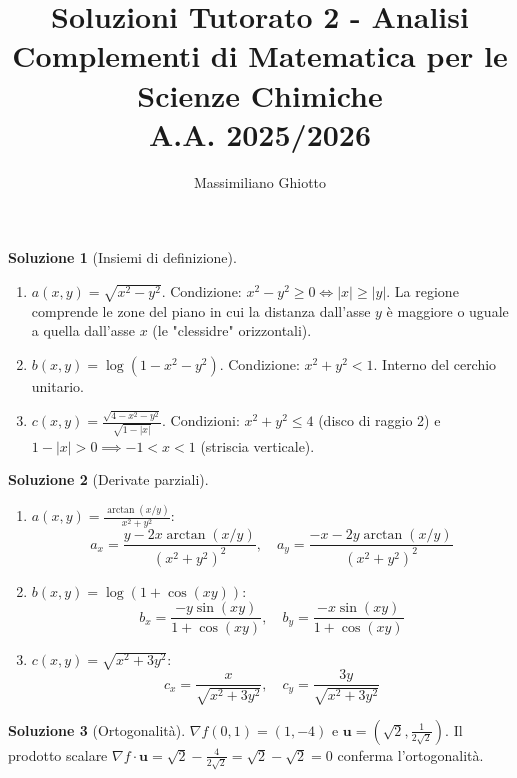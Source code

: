 \documentclass[12pt,a4paper]{article}
\title{Soluzioni Tutorato 2 - Analisi\\Complementi di Matematica per le Scienze Chimiche\\ A.A. 2025/2026}
\author{Massimiliano Ghiotto}
\date{}
\theoremstyle{definition}
\newtheorem{sol}{Soluzione}
\begin{document}
\maketitle

\begin{sol}[Insiemi di definizione]
    \begin{enumerate}
        \item $a(x,y) = \sqrt{x^2 - y^2}$. Condizione: $x^2 - y^2 \geq 0 \iff |x| \geq |y|$. La regione comprende le zone del piano in cui la distanza dall'asse $y$ è maggiore o uguale a quella dall'asse $x$ (le "clessidre" orizzontali).
        \item $b(x,y) = \log(1 - x^2 - y^2)$. Condizione: $x^2 + y^2 < 1$. Interno del cerchio unitario.
        \item $c(x,y) = \frac{\sqrt{4 - x^2 - y^2}}{\sqrt{1 - |x|}}$. Condizioni: $x^2 + y^2 \leq 4$ (disco di raggio 2) e $1 - |x| > 0 \implies -1 < x < 1$ (striscia verticale).
    \end{enumerate}
\end{sol}

\begin{sol}[Derivate parziali]
    \begin{enumerate}
        \item $a(x,y) = \frac{\arctan(x/y)}{x^2 + y^2}$:
              \[ a_x = \frac{y - 2x \arctan(x/y)}{(x^2+y^2)^2}, \quad a_y = \frac{-x - 2y \arctan(x/y)}{(x^2+y^2)^2} \]
        \item $b(x,y) = \log(1 + \cos(xy))$:
              \[ b_x = \frac{-y \sin(xy)}{1 + \cos(xy)}, \quad b_y = \frac{-x \sin(xy)}{1 + \cos(xy)} \]
        \item $c(x,y) = \sqrt{x^2 + 3y^2}$:
              \[ c_x = \frac{x}{\sqrt{x^2+3y^2}}, \quad c_y = \frac{3y}{\sqrt{x^2+3y^2}} \]
    \end{enumerate}
\end{sol}

\begin{sol}[Ortogonalità]
    $\nabla f(0,1) = (1, -4)$ e $\mathbf{u} = (\sqrt{2}, \frac{1}{2\sqrt{2}})$.
    Il prodotto scalare $\nabla f \cdot \mathbf{u} = \sqrt{2} - \frac{4}{2\sqrt{2}} = \sqrt{2} - \sqrt{2} = 0$ conferma l'ortogonalità.
\end{sol}
\end{document}
